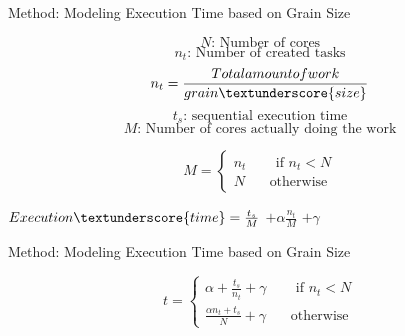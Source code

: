 \documentclass[10pt]{beamer}
\begin{document}
\begin{frame}{Method: Modeling Execution Time based on Grain Size}
	\begin{outline}	

		$$N\text{: Number of cores}$$	
		$$n_t \text{: Number of created tasks}	$$
		$$n_t=\frac{Total amount of work}{grain\textunderscore{size}}$$
		$$t_s\text{: sequential execution time}$$
		$$M\text{: Number of cores actually doing the work}$$

		$$M=\left\{
		\begin{aligned}
		n_t  \:\:\:\:\:\:\:\:      \text{ if } n_t<N\\
		N\:\:\:\:\:\:\:\:     \text{otherwise}
		\end{aligned}
		\right.$$
		
		\pause
		$Execution\textunderscore{time}=\frac{t_s}{M}$
		\pause
		$+\alpha\frac{n_t}{M}$
		\pause
		$+\gamma$
	\end{outline}
\end{frame}

\begin{frame}{Method: Modeling Execution Time based on Grain Size}
\begin{outline}		
	$$t=\left\{
	\begin{aligned}
		\alpha+\frac{t_s}{n_t}+\gamma  \:\:\:\:\:\:\:\:      \text{ if } n_t<N\\
		\frac{\alpha{n_t}+t_s}{N}+\gamma\:\:\:\:\:\:\:\:     \text{otherwise}
	\end{aligned}
	\right.$$


\end{outline}
\end{frame}
\end{document}
